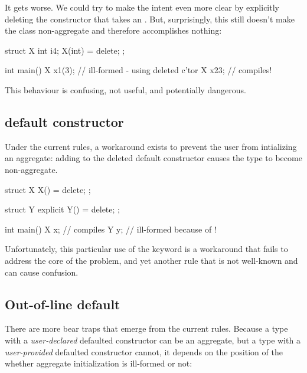 It gets worse. We could try to make the intent even more clear by explicitly deleting the constructor that takes an . But, surprisingly, this still doesn't make the class non-aggregate and therefore accomplishes nothing:

\begin{codeblock}
struct X {
  int i{4};
  X(int) = delete;
};

int main() {
  X x1(3);  // ill-formed - using deleted c'tor
  X x2{3};  // compiles!
}
\end{codeblock}

This behaviour is confusing, not useful, and potentially dangerous.


\subsection{ default constructor}

Under the current rules, a workaround exists to prevent the user from intializing an aggregate: adding  to the deleted default constructor causes the type to become non-aggregate.

\begin{codeblock}
struct X {
  X() = delete;
};

struct Y {
  explicit Y() = delete;
};

int main() {
  X x{};  // compiles 
  Y y{};  // ill-formed because of !
}
\end{codeblock}

Unfortunately, this particular use of the  keyword is a workaround that fails to address the core of the problem, and yet another rule that is not well-known and can cause confusion.


\subsection{Out-of-line default}

There are more bear traps that emerge from the current rules. Because a type with a \emph{user-declared} defaulted constructor can be an aggregate, but a type with a \emph{user-provided} defaulted constructor cannot, it depends on the position of the  whether aggregate initialization is ill-formed or not:

